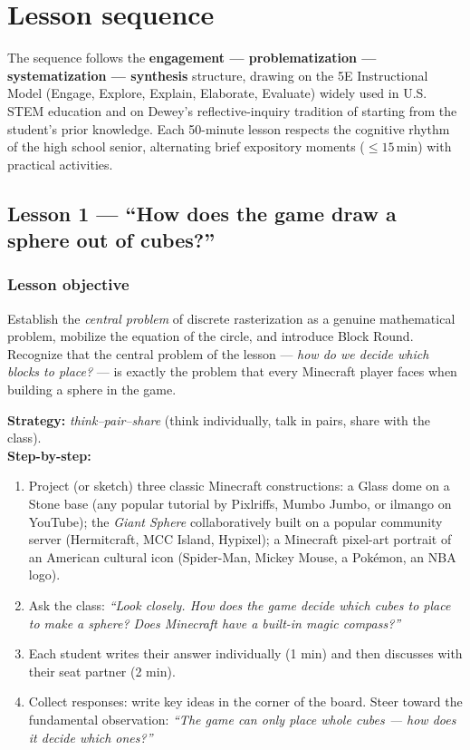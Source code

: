 \documentclass[12pt,a4paper]{scrartcl}
\newcommand{\acc}[1]{\textcolor{accent}{\textbf{#1}}}
\newcommand{\timetag}[1]{\textnormal{\footnotesize\color{bg!90!white}\textsf{#1}}}
\begin{document}
\section{Lesson sequence}\label{sec:sequence}

The sequence follows the \acc{engagement --- problematization --- systematization --- synthesis} structure, drawing on the 5E Instructional Model (Engage, Explore, Explain, Elaborate, Evaluate) widely used in U.S. STEM education and on Dewey's reflective-inquiry tradition of starting from the student's prior knowledge. Each 50-minute lesson respects the cognitive rhythm of the high school senior, alternating brief expository moments ($\leq 15$\,min) with practical activities.

\subsection{Lesson 1 --- \enquote{How does the game draw a sphere out of cubes?}}\label{lesson1}

\subsubsection*{Lesson objective}
Establish the \emph{central problem} of discrete rasterization as a genuine mathematical problem, mobilize the equation of the circle, and introduce Block Round. Recognize that the central problem of the lesson --- \emph{how do we decide which blocks to place?} --- is exactly the problem that every Minecraft player faces when building a sphere in the game.

\begin{activity}[1.1 --- Engagement \quad\timetag{10 min}]
\textbf{Strategy:} \emph{think--pair--share} (think individually, talk in pairs, share with the class). \\[0.4em]
\textbf{Step-by-step:}
\begin{enumerate}[leftmargin=1.5em,itemsep=0.2em,topsep=0.3em,nosep]
  \item Project (or sketch) three classic Minecraft constructions: a Glass dome on a Stone base (any popular tutorial by Pixlriffs, Mumbo Jumbo, or ilmango on YouTube); the \emph{Giant Sphere} collaboratively built on a popular community server (Hermitcraft, MCC Island, Hypixel); a Minecraft pixel-art portrait of an American cultural icon (Spider-Man, Mickey Mouse, a Pokémon, an NBA logo).
  \item Ask the class: \emph{\enquote{Look closely. How does the game decide which cubes to place to make a sphere? Does Minecraft have a built-in magic compass?}}
  \item Each student writes their answer individually (1 min) and then discusses with their seat partner (2 min).
  \item Collect responses: write key ideas in the corner of the board. Steer toward the fundamental observation: \emph{\enquote{The game can only place whole cubes --- how does it decide which ones?}}
\end{enumerate}
\end{activity}
\end{document}
